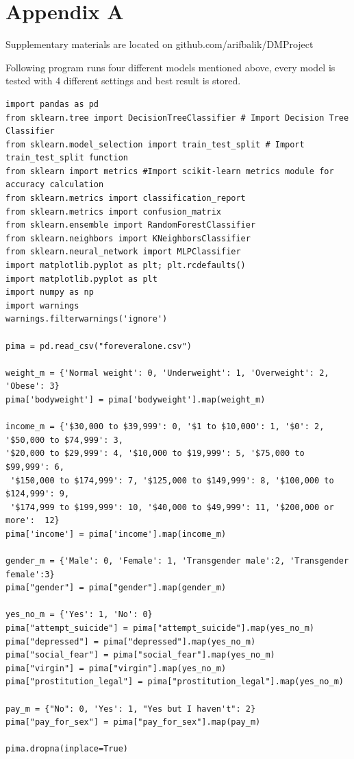 \documentclass{article}
\begin{document}
\newpage
\section*{Appendix A}

Supplementary materials are located on github.com/arifbalik/DMProject

Following program runs four different models mentioned above, every model is tested with 4 different settings and best result is stored.
\begin{verbatim}
import pandas as pd
from sklearn.tree import DecisionTreeClassifier # Import Decision Tree Classifier
from sklearn.model_selection import train_test_split # Import train_test_split function
from sklearn import metrics #Import scikit-learn metrics module for accuracy calculation
from sklearn.metrics import classification_report
from sklearn.metrics import confusion_matrix
from sklearn.ensemble import RandomForestClassifier
from sklearn.neighbors import KNeighborsClassifier
from sklearn.neural_network import MLPClassifier
import matplotlib.pyplot as plt; plt.rcdefaults()
import matplotlib.pyplot as plt
import numpy as np
import warnings
warnings.filterwarnings('ignore')

pima = pd.read_csv("foreveralone.csv")

weight_m = {'Normal weight': 0, 'Underweight': 1, 'Overweight': 2, 'Obese': 3}
pima['bodyweight'] = pima['bodyweight'].map(weight_m)

income_m = {'$30,000 to $39,999': 0, '$1 to $10,000': 1, '$0': 2, '$50,000 to $74,999': 3,
'$20,000 to $29,999': 4, '$10,000 to $19,999': 5, '$75,000 to $99,999': 6,
 '$150,000 to $174,999': 7, '$125,000 to $149,999': 8, '$100,000 to $124,999': 9,
 '$174,999 to $199,999': 10, '$40,000 to $49,999': 11, '$200,000 or more':  12}
pima['income'] = pima['income'].map(income_m)

gender_m = {'Male': 0, 'Female': 1, 'Transgender male':2, 'Transgender female':3}
pima["gender"] = pima["gender"].map(gender_m)

yes_no_m = {'Yes': 1, 'No': 0}
pima["attempt_suicide"] = pima["attempt_suicide"].map(yes_no_m)
pima["depressed"] = pima["depressed"].map(yes_no_m)
pima["social_fear"] = pima["social_fear"].map(yes_no_m)
pima["virgin"] = pima["virgin"].map(yes_no_m)
pima["prostitution_legal"] = pima["prostitution_legal"].map(yes_no_m)

pay_m = {"No": 0, 'Yes': 1, "Yes but I haven't": 2}
pima["pay_for_sex"] = pima["pay_for_sex"].map(pay_m)

pima.dropna(inplace=True)




\end{verbatim}
\end{document}

